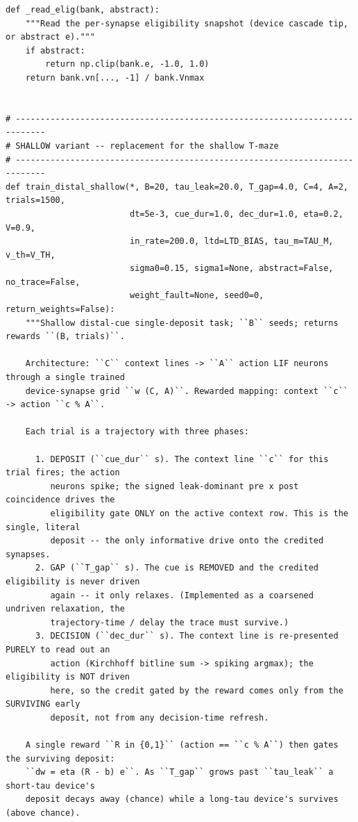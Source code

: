 \begin{lstlisting}[caption={mrl\_trace/distal\_cue.py},label={lst:siox-src-distal_cue}]
def _read_elig(bank, abstract):
    """Read the per-synapse eligibility snapshot (device cascade tip, or abstract e)."""
    if abstract:
        return np.clip(bank.e, -1.0, 1.0)
    return bank.vn[..., -1] / bank.Vnmax


# ----------------------------------------------------------------------------
# SHALLOW variant -- replacement for the shallow T-maze
# ----------------------------------------------------------------------------
def train_distal_shallow(*, B=20, tau_leak=20.0, T_gap=4.0, C=4, A=2, trials=1500,
                         dt=5e-3, cue_dur=1.0, dec_dur=1.0, eta=0.2, V=0.9,
                         in_rate=200.0, ltd=LTD_BIAS, tau_m=TAU_M, v_th=V_TH,
                         sigma0=0.15, sigma1=None, abstract=False, no_trace=False,
                         weight_fault=None, seed0=0, return_weights=False):
    """Shallow distal-cue single-deposit task; ``B`` seeds; returns rewards ``(B, trials)``.

    Architecture: ``C`` context lines -> ``A`` action LIF neurons through a single trained
    device-synapse grid ``w (C, A)``. Rewarded mapping: context ``c`` -> action ``c % A``.

    Each trial is a trajectory with three phases:

      1. DEPOSIT (``cue_dur`` s). The context line ``c`` for this trial fires; the action
         neurons spike; the signed leak-dominant pre x post coincidence drives the
         eligibility gate ONLY on the active context row. This is the single, literal
         deposit -- the only informative drive onto the credited synapses.
      2. GAP (``T_gap`` s). The cue is REMOVED and the credited eligibility is never driven
         again -- it only relaxes. (Implemented as a coarsened undriven relaxation, the
         trajectory-time / delay the trace must survive.)
      3. DECISION (``dec_dur`` s). The context line is re-presented PURELY to read out an
         action (Kirchhoff bitline sum -> spiking argmax); the eligibility is NOT driven
         here, so the credit gated by the reward comes only from the SURVIVING early
         deposit, not from any decision-time refresh.

    A single reward ``R in {0,1}`` (action == ``c % A``) then gates the surviving deposit:
    ``dw = eta (R - b) e``. As ``T_gap`` grows past ``tau_leak`` a short-tau device's
    deposit decays away (chance) while a long-tau device's survives (above chance).


\end{lstlisting}
